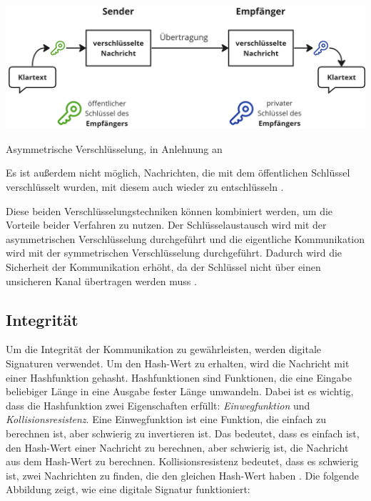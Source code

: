 \begin{center}
    \captionsetup{type=figure}
    \includegraphics[width=1\linewidth]{images/asymmetric_encryption.png}
    \caption{Asymmetrische Verschlüsselung, in Anlehnung an \cite{ElektronikKompendium_asymmetrischeVerschluesselung}}
    \label{fig:asymmetrische_verschluesselung}
\end{center}

\noindent Es ist außerdem nicht möglich, Nachrichten, die mit dem öffentlichen Schlüssel verschlüsselt wurden, mit diesem auch wieder zu entschlüsseln \parencite{ElektronikKompendium_asymmetrischeVerschluesselung}. 

Diese beiden Verschlüsselungstechniken können kombiniert werden, um die Vorteile beider Verfahren zu nutzen. Der Schlüsselaustausch wird mit der asymmetrischen Verschlüsselung durchgeführt und die eigentliche Kommunikation wird mit der symmetrischen Verschlüsselung durchgeführt. Dadurch wird die Sicherheit der Kommunikation erhöht, da der Schlüssel nicht über einen unsicheren Kanal übertragen werden muss \Parencite[S. 5-8]{Wong_KryptoPraxis}. 


\subsection{Integrität}

Um die Integrität der Kommunikation zu gewährleisten, werden digitale Signaturen verwendet. Um den Hash-Wert zu erhalten, wird die Nachricht mit einer Hashfunktion gehasht. Hashfunktionen sind Funktionen, die eine Eingabe beliebiger Länge in eine Ausgabe fester Länge umwandeln. Dabei ist es wichtig, dass die Hashfunktion zwei Eigenschaften erfüllt: \textit{Einwegfunktion} und \textit{Kollisionsresistenz}. Eine Einwegfunktion ist eine Funktion, die einfach zu berechnen ist, aber schwierig zu invertieren ist. Das bedeutet, dass es einfach ist, den Hash-Wert einer Nachricht zu berechnen, aber schwierig ist, die Nachricht aus dem Hash-Wert zu berechnen. Kollisionsresistenz bedeutet, dass es schwierig ist, zwei Nachrichten zu finden, die den gleichen Hash-Wert haben \parencite[S. 13-15]{Brünnler_BlockchainKurzGut}. Die folgende Abbildung zeigt, wie eine digitale Signatur funktioniert:

